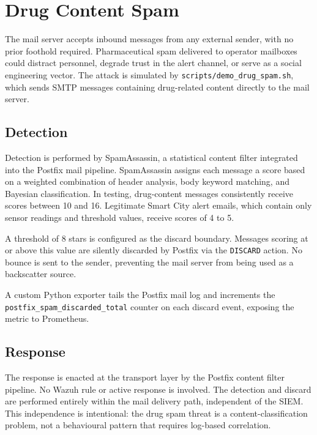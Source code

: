 \section{Drug Content Spam}
\label{sec:threat-drugspam}

The mail server accepts inbound messages from any external sender, with no prior
foothold required. Pharmaceutical spam delivered to operator mailboxes could
distract personnel, degrade trust in the alert channel, or serve as a social
engineering vector. The attack is simulated by \texttt{scripts/demo\_drug\_spam.sh}, which sends
SMTP messages containing drug-related content directly to the mail server.

\subsection{Detection}

Detection is performed by SpamAssassin, a statistical content filter integrated
into the Postfix mail pipeline. SpamAssassin assigns each message a score based
on a weighted combination of header analysis, body keyword matching, and
Bayesian classification. In testing, drug-content messages consistently receive
scores between 10 and 16. Legitimate Smart City alert emails, which contain only
sensor readings and threshold values, receive scores of 4 to 5.

A threshold of 8 stars is configured as the discard boundary. Messages scoring
at or above this value are silently discarded by Postfix via the \texttt{DISCARD}
action. No bounce is sent to the sender, preventing the mail server from being
used as a backscatter source.

A custom Python exporter tails the
Postfix mail log and increments the \texttt{postfix\_spam\_discarded\_total}
counter on each discard event, exposing the metric to Prometheus.

\subsection{Response}

The response is enacted at the transport layer by the Postfix content filter
pipeline. No Wazuh rule or active response is involved. The detection and
discard are performed entirely within the mail delivery path, independent of
the SIEM. This independence is intentional: the drug spam threat is a
content-classification problem, not a behavioural pattern that requires
log-based correlation.

